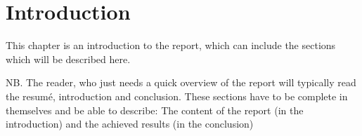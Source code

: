 \chapter{Introduction}
This chapter is an introduction to the report, which can include the sections which will be described here.

NB. The reader, who just needs a quick overview of the report will typically read the resumé, introduction and conclusion. These sections have to be complete in themselves and be able to describe: The content of the report (in the introduction) and the achieved results (in the conclusion)

\FloatBarrier

\FloatBarrier

\FloatBarrier

\FloatBarrier

\FloatBarrier

\FloatBarrier